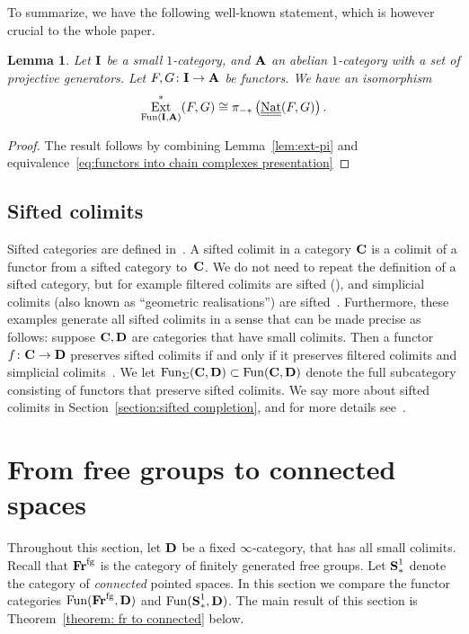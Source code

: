 \documentclass[psamsfonts]{amsart}
\theoremstyle{plain}
\newtheorem{lem}[thm]{Lemma}
\theoremstyle{definition}
\theoremstyle{remark}
\newcommand{\catname}[1]{{\normalfont\textbf{#1}}}
\newcommand{\spaces}{\catname{S}_*}
\newcommand{\connected}{\spaces^{1}}
\newcommand{\fr}{\allfr^{\mathrm{fg}}}
\newcommand{\allfr}{\catname{Fr}}
\DeclareMathOperator{\ext}{Ext}
\DeclareMathOperator{\nat}{Nat}
\DeclareMathOperator{\spectralNat}{\underline{\underline{\nat}}}
\DeclareMathOperator{\fun}{Fun}
\begin{document}
To summarize, we have the following well-known statement, which is however crucial to the whole paper.
\begin{lem}\label{lem:key isomorphism}
Let $\catname{I}$ be a small $1$-category, and $\catname{A}$ an abelian $1$-category with a set of projective generators. Let $F, G\colon\catname{I}\to \catname{A}$ be functors. We have an isomorphism %
\begin{equation}\label{eq:key isomorphism}
\ext^*_{\fun(\catname{I}, \catname{A})}(F, G)\cong\pi_{-*}\left(\spectralNat(F, G)\right).
\end{equation}
\end{lem}
\begin{proof}
The result follows by combining Lemma~\ref{lem:ext-pi} and equivalence~\eqref{eq:functors into chain complexes presentation}
\end{proof}

\subsection{Sifted colimits}\label{section:sifted} 
Sifted categories are defined in~\cite[Definition 5.5.8.1]{LurieHTT}. A sifted colimit in a category $\catname{C}$ is a colimit of a functor from a sifted category to~$\catname{C}$. We do not need to repeat the definition of a sifted category, but for example filtered colimits are sifted (\cite[Proposition 5.3.1.22]{LurieHTT}), and simplicial colimits (also known as ``geometric realisations'') are sifted~\cite[Lemma 5.5.8.4]{LurieHTT}. Furthermore, these examples generate all sifted colimits in a sense that can be made precise as follows: suppose $\catname{C}, \catname{D}$ are categories that have small colimits. Then a functor $f\colon \catname{C}\to\catname{D}$ preserves sifted colimits if and only if it preserves filtered colimits and simplicial colimits~\cite[Corollary 5.5.8.17]{LurieHTT}. We let $\fun_{\Sigma}(\catname{C}, \catname{D})\subset \fun(\catname{C}, \catname{D})$ denote the full subcategory consisting of functors that preserve sifted colimits. We say more about sifted colimits in Section~\ref{section:sifted completion}, and for more details see~\cite[Section 5.5.8]{LurieHTT}.


\section{From free groups to connected spaces}\label{section: fr to connected}
Throughout this section, let $\catname{D}$ be a fixed $\infty$-category, that has all small colimits. Recall that $\fr$ is the category of finitely generated free groups. Let $\connected$ denote the category of \emph{connected} pointed spaces. In this section we compare the functor categories $\fun(\fr, \catname{D})$ and $\fun(\connected, \catname{D})$. The main result of this section is Theorem~\ref{theorem: fr to connected} below. 
\end{document}
